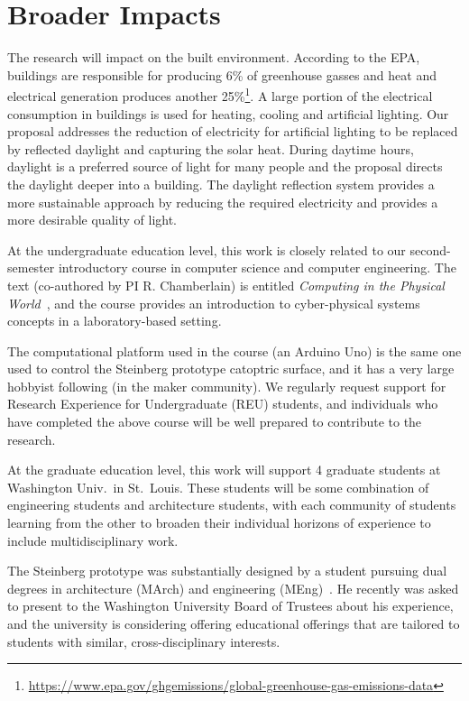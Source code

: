 \section{Broader Impacts}
\label{sec:broader}

The research will impact on the built environment.
According to the EPA, buildings are responsible for producing 6\% of
greenhouse gasses and heat and electrical generation produces another
25\%\footnote{\url{https://www.epa.gov/ghgemissions/global-greenhouse-gas-emissions-data}}.
A large portion of the electrical consumption in buildings is used for
heating, cooling and artificial lighting. Our proposal addresses the
reduction of electricity for artificial lighting to be replaced by
reflected daylight and capturing the solar heat. During daytime hours,
daylight is a preferred source of light for many people and the proposal
directs the daylight deeper into a building. The daylight reflection system
provides a more sustainable approach by reducing the required electricity
and provides a more desirable quality of light.

At the undergraduate education level, this work is closely related to
our second-semester introductory course in computer science and
computer engineering.  The
text (co-authored by PI R. Chamberlain) is entitled {\it Computing
in the Physical World}~\cite{cc17}, and the course provides an introduction to
cyber-physical systems concepts in a laboratory-based setting.

The computational platform used in the course (an Arduino Uno) is the
same one used to control the Steinberg prototype catoptric surface,
and it has a very large hobbyist following (in the maker community).
We regularly request support for Research Experience for Undergraduate
(REU) students, and individuals who have completed
the above course will be well prepared to contribute to the research.

At the graduate education level, this work will support 4 graduate
students at Washington Univ.~in St.~Louis.
These students will be some combination of engineering students and
architecture students, with each community of students learning from
the other to broaden their individual horizons of experience to
include multidisciplinary work.

The Steinberg prototype was substantially designed by a student pursuing
dual degrees in architecture (MArch) and engineering (MEng)~\cite{Mitchell18}.
He recently was asked to present to the Washington University Board
of Trustees about his experience, and the university is considering
offering educational offerings that are tailored to students with
similar, cross-disciplinary interests.

